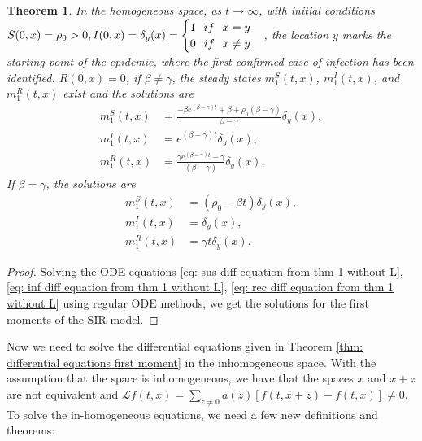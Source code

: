 \documentclass[sn-basic]{sn-jnl}%
\theoremstyle{thmstyleone}%
\newtheorem{theorem}{Theorem}%
\theoremstyle{thmstyletwo}%
\theoremstyle{thmstylethree}%
\numberwithin{equation}{theorem}
\begin{document}
\begin{theorem}\label{thm:first moment homogeneous space}
In the homogeneous space, as $t \longrightarrow \infty$, with initial conditions $S(0,x) = \rho_{0} >0, I(0,x) = \delta_y(x)=\begin{cases}
        1 \hspace{.25cm} if \hspace{.25cm} x=y\\
        0 \hspace{.25cm} if \hspace{.25cm} x \neq y
\end{cases}$, the location $y$ marks the starting point of the epidemic, where the first confirmed case of infection has been identified. $R(0,x)=0$, if $\beta \neq \gamma$, the steady states $m_{1}^{S}(t,x)$, $m_{1}^{I}(t,x)$, and $m_{1}^{R}(t,x)$ exist and the solutions are 
\begin{align}
m_{1}^{S}(t,x) &= \displaystyle \frac{-\beta e^{\displaystyle (\beta -\gamma)t} + \beta + \rho_{0}(\beta - \gamma)}{\beta - \gamma}\delta_y(x),\\
m_{1}^{I}(t,x) &= e^{\displaystyle (\beta -\gamma)t}\delta_y(x),\\
m_{1}^{R}(t,x) &= \displaystyle \frac{\gamma e^{\displaystyle (\beta - \gamma)t} - \gamma}{(\beta - \gamma)}\delta_y(x).
\end{align}
If $\beta = \gamma$, the solutions are
\begin{align}
m_{1}^{S}(t,x) &= (\rho_{0}- \beta  t)\delta_y(x),\\
m_{1}^{I}(t,x) &= \delta_y(x) ,\\
m_{1}^{R}(t,x) &= \gamma  t \delta_y(x).
\end{align}
\end{theorem}

\begin{proof} Solving the ODE equations \eqref{eq: sus diff equation from thm 1 without L}, \eqref{eq: inf diff equation from thm 1 without L}, \eqref{eq: rec diff equation from thm 1 without L} using regular ODE methods, we get the solutions for the first moments of the SIR model.
\end{proof}

Now we need to solve the differential equations given in Theorem \ref{thm: differential equations first moment} in the inhomogeneous space. With the assumption that the space is inhomogeneous, we have that the spaces $x$ and $x+z$ are not equivalent and $\mathcal{L} f(t,x)= \sum\limits_{z \neq 0} a(z)[f(t,x+z)-f(t,x)] \neq 0$. To solve the in-homogeneous equations, we need a few new definitions and theorems:
    
\end{document}
